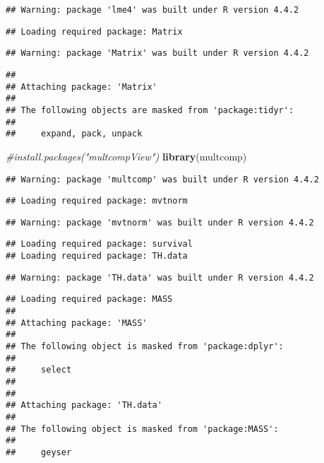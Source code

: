 \documentclass[
]{article}
\newenvironment{Shaded}{\begin{snugshade}}{\end{snugshade}}
\newcommand{\CommentTok}[1]{\textcolor[rgb]{0.56,0.35,0.01}{\textit{#1}}}
\newcommand{\FunctionTok}[1]{\textcolor[rgb]{0.13,0.29,0.53}{\textbf{#1}}}
\newcommand{\NormalTok}[1]{#1}
\begin{document}
\begin{verbatim}
## Warning: package 'lme4' was built under R version 4.4.2
\end{verbatim}

\begin{verbatim}
## Loading required package: Matrix
\end{verbatim}

\begin{verbatim}
## Warning: package 'Matrix' was built under R version 4.4.2
\end{verbatim}

\begin{verbatim}
## 
## Attaching package: 'Matrix'
## 
## The following objects are masked from 'package:tidyr':
## 
##     expand, pack, unpack
\end{verbatim}

\begin{Shaded}
\begin{Highlighting}[]
\CommentTok{\#install.packages("multcompView")}
\FunctionTok{library}\NormalTok{(multcomp)}
\end{Highlighting}
\end{Shaded}

\begin{verbatim}
## Warning: package 'multcomp' was built under R version 4.4.2
\end{verbatim}

\begin{verbatim}
## Loading required package: mvtnorm
\end{verbatim}

\begin{verbatim}
## Warning: package 'mvtnorm' was built under R version 4.4.2
\end{verbatim}

\begin{verbatim}
## Loading required package: survival
## Loading required package: TH.data
\end{verbatim}

\begin{verbatim}
## Warning: package 'TH.data' was built under R version 4.4.2
\end{verbatim}

\begin{verbatim}
## Loading required package: MASS
## 
## Attaching package: 'MASS'
## 
## The following object is masked from 'package:dplyr':
## 
##     select
## 
## 
## Attaching package: 'TH.data'
## 
## The following object is masked from 'package:MASS':
## 
##     geyser
\end{verbatim}
\end{document}
